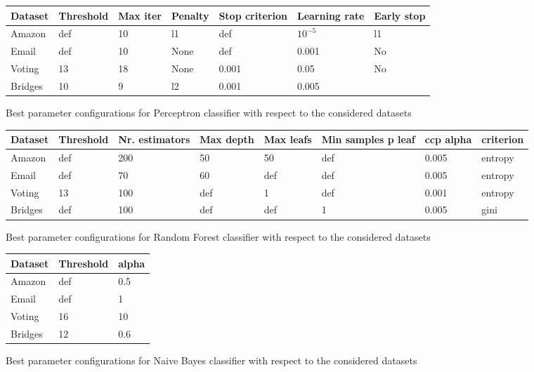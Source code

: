 \documentclass[11pt]{article}
\begin{document}
\begin{figure}[h]
\centering
  \begin{tabular}{ | l | l | l | l | l | l | l |}
	\hline
    Dataset & Threshold & Max iter & Penalty & Stop criterion & Learning rate & Early stop\\  
    \hline
    Amazon  & def & 10 & l1   & def & $10^{-5}$ & l1   \\  
    \hline
    Email   & def & 10 & None & def & 0.001     & No \\  
    \hline
    Voting & 13 & 18 & None & 0.001 & 0.05 & No  \\
    \hline
   Bridges & 10 & 9 & l2 & 0.001 & 0.005 &   \\
	\hline
    \end{tabular}
    \caption{Best parameter configurations for Perceptron classifier with respect to the considered datasets}
    \label{fig_conc1}
  \end{figure}
  
  \begin{figure}[h]
\centering
  \begin{tabular}{ | l | l | l | l | l | l | l | l|}
	\hline
    Dataset & Threshold & Nr. estimators & Max depth & Max leafs & Min samples p leaf & ccp alpha & criterion\\  
    \hline
    Amazon  & def & 200  & 50   & 50    & def   &	0.005 & entropy	 \\  
    \hline
    Email   & def &  70  &  60  &  def  &  def  & 0.005 & entropy	 \\  
    \hline
    Voting  & 13  & 100  & def  & 1     & def   & 0.001 & entropy  \\
    \hline
    Bridges & def &  100 &  def &  def  &  1     & 0.005 & gini\\
	\hline
    \end{tabular}%
    \caption{Best parameter configurations for Random Forest classifier with respect to the considered datasets}
    \label{fig_conc2}
  \end{figure}
  
  
\begin{figure}[h]
\centering
  \begin{tabular}{ | l | l | l |}
	\hline
    Dataset & Threshold & alpha \\  
    \hline
    Amazon  & def & 0.5    \\  
    \hline
    Email   & def & 1 \\  
    \hline
    Voting & 16 &  10 \\
    \hline
    Bridges & 12 & $0.6$ \\
	\hline
    \end{tabular}
    \caption{Best parameter configurations for Naive Bayes classifier with respect to the considered datasets}
    \label{tab_conc1}
  \end{figure}

%
\newpage
 

\end{document}
